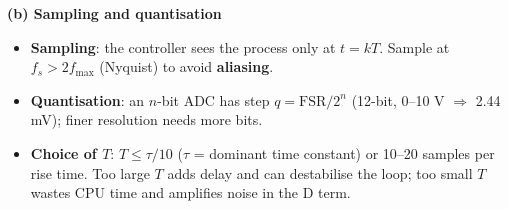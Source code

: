 \documentclass[11pt,a4paper]{article}
\begin{document}
\begin{enumerate}
\begin{answer}
			\textbf{(b) Sampling and quantisation}
			\begin{itemize}[itemsep=1pt]
				\item \textbf{Sampling}: the controller sees the process only at $t = kT$. Sample at $f_s > 2f_{\max}$ (Nyquist) to avoid \textbf{aliasing}.
				\item \textbf{Quantisation}: an $n$-bit ADC has step $q = \text{FSR}/2^n$ (12-bit, 0--10 V $\Rightarrow$ 2.44 mV); finer resolution needs more bits.
				\item \textbf{Choice of $T$}: $T \le \tau/10$ ($\tau$ = dominant time constant) or 10--20 samples per rise time. Too large $T$ adds delay and can destabilise the loop; too small $T$ wastes CPU time and amplifies noise in the D term.
			\end{itemize}


\end{answer}
\end{enumerate}
\end{document}
